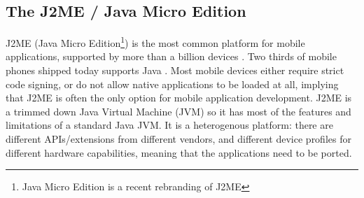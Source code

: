 \documentclass[11pt]{report}
\begin{document}
%
%

\subsection{The J2ME / Java Micro Edition}

J2ME (Java Micro Edition\footnote{Java Micro Edition is a recent rebranding of J2ME}) is the most common platform for mobile applications, supported by more than a billion devices \cite{sun-j2me}. 
Two thirds of mobile phones shipped today supports Java \cite{esmertec-globenews}. 
Most mobile devices either require strict code signing, or do not allow native applications to be loaded at all, implying that J2ME is often the only option for mobile application development.
J2ME is a trimmed down Java Virtual Machine (JVM) so it has most of the features and limitations of a standard Java JVM.
It is a heterogenous platform:
there are different APIs/extensions from different vendors, and different device profiles for different hardware capabilities, meaning that the applications need to be ported.
\end{document}
